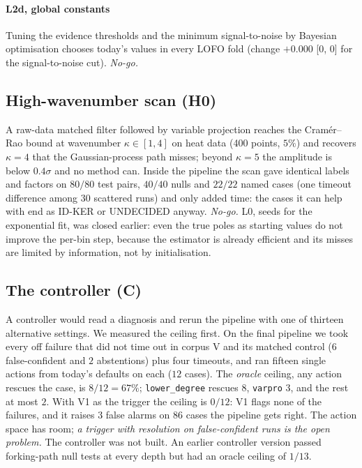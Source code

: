 \documentclass[11pt]{article}
\theoremstyle{plain}
\theoremstyle{definition}
\theoremstyle{remark}
\newcommand{\lab}[1]{\textsf{#1}}           %
\newcommand{\IDK}{\lab{ID-KER}}
\newcommand{\UND}{\lab{UNDECIDED}}
\begin{document}
\paragraph{L2d, global constants} Tuning the evidence thresholds and the minimum signal-to-noise by Bayesian optimisation chooses today's values in every LOFO fold
(change $+0.000$ [$0$, $0$] for the signal-to-noise cut). \emph{No-go.}

\subsection{High-wavenumber scan (H0)}\label{sec:highk}
A raw-data matched filter followed by variable projection reaches the Cram\'er--Rao bound at wavenumber $\kappa\in[1,4]$ on heat data (400 points, $5\%$) and recovers
$\kappa=4$ that the Gaussian-process path misses; beyond $\kappa=5$ the amplitude is below $0.4\sigma$ and no method can. Inside the pipeline the scan gave identical labels and factors on
$80/80$ test pairs, $40/40$ nulls and $22/22$ named cases (one timeout difference among $30$ scattered runs) and only added time: the cases it can help with end as \IDK{} or \UND{} anyway. \emph{No-go.}
L0, seeds for the exponential fit, was closed earlier: even the true poles as starting values do not improve the per-bin step, because the estimator is already efficient and its misses are
limited by information, not by initialisation.

\subsection{The controller (C)}\label{sec:controller}
A controller would read a diagnosis and rerun the pipeline with one of thirteen alternative settings. We measured the ceiling first. On the final pipeline we took every off failure that
did not time out in corpus V and its matched control ($6$ false-confident and $2$ abstentions) plus four timeouts, and ran fifteen single actions from today's defaults on each ($12$ cases).
The \emph{oracle} ceiling, any action rescues the case, is $8/12=67\%$; \texttt{lower\_degree} rescues $8$, \texttt{varpro} $3$, and the rest at most $2$. With V1 as the trigger the ceiling is
$0/12$: V1 flags none of the failures, and it raises $3$ false alarms on $86$ cases the pipeline gets right. The action space has room; \emph{a trigger with resolution on false-confident runs is the open problem.}
The controller was not built. An earlier controller version passed forking-path null tests at every depth but had an oracle ceiling of $1/13$.
\end{document}
